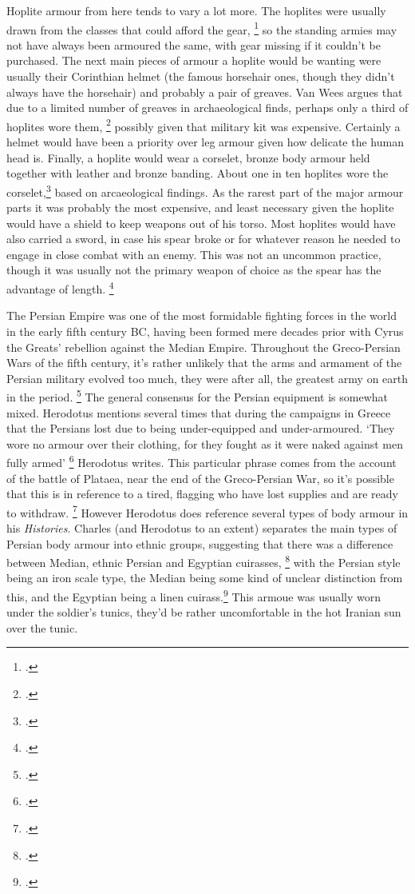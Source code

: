 \documentclass[twoside, a4paper, 12pt]{article}
\begin{document}
Hoplite armour from here tends to vary a lot more. The hoplites
were usually drawn from the classes that could afford the gear, \footcite[38]{wietzel_wheeler_1970}
so the standing armies may not have always been armoured the same, with gear
missing if it couldn't be purchased. The next main pieces of armour a hoplite
would be wanting were usually their Corinthian helmet (the famous horsehair
ones, though they didn't always have the horsehair) and probably a pair of greaves.
Van Wees argues that due to a limited number of greaves in archaeological finds,
perhaps only a third of hoplites wore them, \footcite[50]{wees_2004} possibly given
that military kit was expensive. Certainly a helmet would have been a priority
over leg armour given how delicate the human head is. Finally, a hoplite would
wear a corselet, bronze body armour held together with leather and bronze banding.
About one in ten hoplites wore the corselet,\footcite{wees_1997} based on
arcaeological findings. As the rarest part of the major
armour parts it was probably the most expensive, and least necessary given the
hoplite would have a shield to keep weapons out of his torso. Most hoplites
would have also carried a sword, in case his spear broke or for whatever reason
he needed to engage in close combat with an enemy. This was not an uncommon
practice, though it was usually not the primary weapon of choice as the spear
has the advantage of length. \footcite{snodgrass_2006}

\par\vspace{1em}

The Persian Empire was one of the most formidable fighting forces in the world
in the early fifth century BC, having been formed mere decades prior with
Cyrus the Greats' rebellion against the Median Empire. Throughout the
Greco-Persian Wars of the fifth century, it's rather unlikely that the arms
and armament of the Persian military evolved too much, they were after all,
the greatest army on earth in the period. \footcite{kim_grecopersia_2017}
The general consensus for the Persian equipment is somewhat mixed.
Herodotus mentions several times that during the campaigns in Greece that
the Persians lost due to being under-equipped and under-armoured.
`They wore no armour over their clothing, for they fought as it were
naked against men fully armed' \footcite[Book 9.63.2]{herodotus_1920}
Herodotus writes. This particular phrase comes from the account of the battle
of Plataea, near the end of the Greco-Persian War, so it's possible that this
is in reference to a tired, flagging who have lost supplies and are ready
to withdraw. \footcite[267]{charles_bodyarmour_2012}
However Herodotus does reference several types of body armour in his \emph{Histories}.
Charles (and Herodotus to an extent) separates the main types of Persian body armour
into ethnic groups, suggesting that there was a difference between Median,
ethnic Persian and Egyptian cuirasses,
\footcite[Book 1.135]{herodotus_1920}
with the Persian style being an iron
scale type, the Median being some kind of unclear distinction from this, and
the Egyptian being a linen cuirass.\footcite[260-2]{charles_bodyarmour_2012}
This armoue was usually worn under the soldier's tunics, they'd be rather
uncomfortable in the hot Iranian sun over the tunic.
\end{document}
